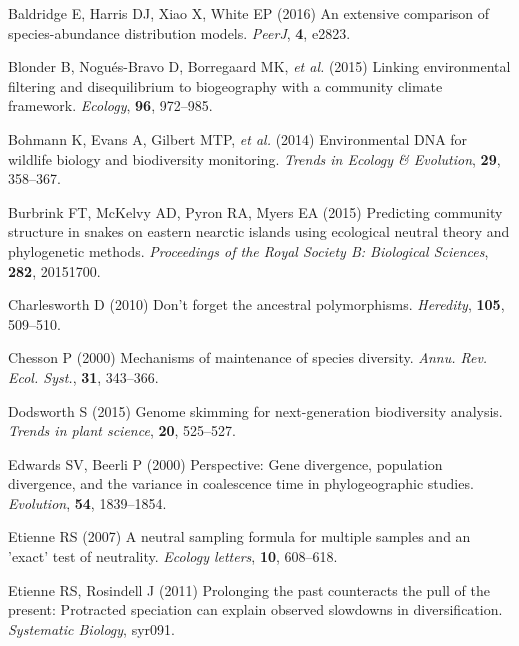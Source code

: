 \documentclass[
]{article}
\newlength{\cslhangindent}
\newlength{\cslentryspacingunit} %
\newenvironment{CSLReferences}[2] %
 {%
  \setlength{\parindent}{0pt}
  \ifodd #1
  \let\oldpar\par
  \def\par{\hangindent=\cslhangindent\oldpar}
  \fi
  \setlength{\parskip}{#2\cslentryspacingunit}
 }%
 {}
\begin{document}
\hypertarget{refs}{}
\begin{CSLReferences}{1}{0}
\leavevmode{}%
Baldridge E, Harris DJ, Xiao X, White EP (2016) An extensive comparison
of species-abundance distribution models. \emph{PeerJ}, \textbf{4},
e2823.

\leavevmode{}%
Blonder B, Nogués-Bravo D, Borregaard MK, \emph{et al.} (2015) Linking
environmental filtering and disequilibrium to biogeography with a
community climate framework. \emph{Ecology}, \textbf{96}, 972--985.

\leavevmode{}%
Bohmann K, Evans A, Gilbert MTP, \emph{et al.} (2014) Environmental DNA
for wildlife biology and biodiversity monitoring. \emph{Trends in
Ecology \& Evolution}, \textbf{29}, 358--367.

\leavevmode{}%
Burbrink FT, McKelvy AD, Pyron RA, Myers EA (2015) Predicting community
structure in snakes on eastern nearctic islands using ecological neutral
theory and phylogenetic methods. \emph{Proceedings of the Royal Society
B: Biological Sciences}, \textbf{282}, 20151700.

\leavevmode{}%
Charlesworth D (2010) Don't forget the ancestral polymorphisms.
\emph{Heredity}, \textbf{105}, 509--510.

\leavevmode{}%
Chesson P (2000) Mechanisms of maintenance of species diversity.
\emph{Annu. Rev. Ecol. Syst.}, \textbf{31}, 343--366.

\leavevmode{}%
Dodsworth S (2015) Genome skimming for next-generation biodiversity
analysis. \emph{Trends in plant science}, \textbf{20}, 525--527.

\leavevmode{}%
Edwards SV, Beerli P (2000) Perspective: Gene divergence, population
divergence, and the variance in coalescence time in phylogeographic
studies. \emph{Evolution}, \textbf{54}, 1839--1854.

\leavevmode{}%
Etienne RS (2007) A neutral sampling formula for multiple samples and an
'exact' test of neutrality. \emph{Ecology letters}, \textbf{10},
608--618.

\leavevmode{}%
Etienne RS, Rosindell J (2011) Prolonging the past counteracts the pull
of the present: Protracted speciation can explain observed slowdowns in
diversification. \emph{Systematic Biology}, syr091.


\end{CSLReferences}
\end{document}
